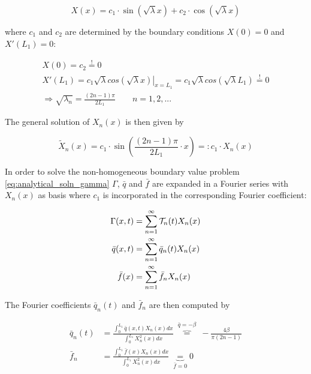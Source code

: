 \documentclass{scrartcl}[12pt, halfparskip]
\begin{document}
\begin{equation}
	X(x) = c_1 \cdot \sin(\sqrt{\lambda} x) + c_2 \cdot \cos(\sqrt{\lambda} x)
\end{equation}

where $c_1$ and $c_2$ are determined by the boundary conditions $X(0) = 0$ and $X'(L_1) = 0$:

\begin{align}
	X(0) = c_2 \stackrel{!}{=} 0 \\
	X'(L_1) = \left. c_1 \sqrt{\lambda} cos(\sqrt{\lambda} x) \right|_{x=L_1} = c_1 \sqrt{\lambda} cos(\sqrt{\lambda} L_1) \stackrel{!}{=} 0 \\
	\Rightarrow \sqrt{\lambda_n} = \frac{(2n -1)\pi}{2 L_1} \qquad n=1,2,...
\end{align}

The general solution of $X_n(x)$ is then given by

\begin{equation}
	\tilde{X}_n(x) = c_1 \cdot \sin\left(\frac{(2n -1)\pi}{2 L_1} \cdot x\right) =: c_1 \cdot X_n(x)
\end{equation}

In order to solve the non-homogeneous boundary value problem \eqref{eq:analytical_soln_gamma} $\Gamma$, $\bar{q}$ and $\bar{f}$ are expanded in a Fourier series with $X_n(x)$ as basis where $c_1$ is incorporated in the corresponding Fourier coefficient:

\begin{subequations}
	\centering
	\begin{align}
		\Gamma(x,t) & = \sum_{n=1}^{\infty} \mathcal{T}_n(t) X_n(x) \\
		\bar{q}(x,t) & = \sum_{n=1}^{\infty} \bar{q}_n(t) X_n(x) \\
		\bar{f}(x) & = \sum_{n=1}^{\infty} \bar{f}_n X_n(x)
	\end{align}
\end{subequations}

The Fourier coefficients $\bar{q}_n(t)$ and $\bar{f}_n$ are then computed by

\begin{subequations}
	\begin{align}
		\bar{q}_n(t) & = \frac{\int_{0}^{L_1} \bar{q}(x,t) X_n(x) dx}{\int_{0}^{L_1} X_n^2(x) dx} \ \overbrace{=}^{\bar{q}=-\beta} \ - \frac{4 \beta}{\pi (2n - 1)} \\
		\bar{f}_n & = \frac{\int_{0}^{L_1} \bar{f}(x) X_n(x) dx}{\int_{0}^{L_1} X_n^2(x) dx} \ \underbrace{=}_{\bar{f}=0} 0
	\end{align}
\end{subequations}
\end{document}
